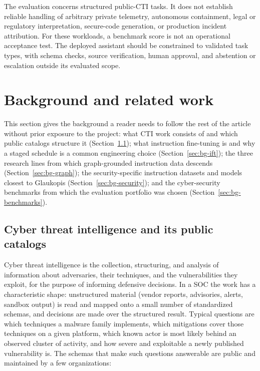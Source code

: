 \documentclass[twocolumn]{svjour3}
\begin{document}
The evaluation concerns structured public-CTI tasks. It does not establish reliable handling of arbitrary private telemetry, autonomous containment, legal or regulatory interpretation, secure-code generation, or production incident attribution. For these workloads, a benchmark score is not an operational acceptance test. The deployed assistant should be constrained to validated task types, with schema checks, source verification, human approval, and abstention or escalation outside its evaluated scope.

\section{Background and related work}\label{sec:related}
This section gives the background a reader needs to follow the rest of the article without prior exposure to the project: what CTI work consists of and which public catalogs structure it (Section~\ref{sec:bg-cti}); what instruction fine-tuning is and why a staged schedule is a common engineering choice (Section~\ref{sec:bg-ift}); the three research lines from which graph-grounded instruction data descends (Section~\ref{sec:bg-graph}); the security-specific instruction datasets and models closest to Glaukopis (Section~\ref{sec:bg-security}); and the cyber-security benchmarks from which the evaluation portfolio was chosen (Section~\ref{sec:bg-benchmarks}).

\subsection{Cyber threat intelligence and its public catalogs}\label{sec:bg-cti}
Cyber threat intelligence is the collection, structuring, and analysis of information about adversaries, their techniques, and the vulnerabilities they exploit, for the purpose of informing defensive decisions. In a SOC the work has a characteristic shape: unstructured material (vendor reports, advisories, alerts, sandbox output) is read and mapped onto a small number of standardized schemas, and decisions are made over the structured result. Typical questions are which techniques a malware family implements, which mitigations cover those techniques on a given platform, which known actor is most likely behind an observed cluster of activity, and how severe and exploitable a newly published vulnerability is. The schemas that make such questions answerable are public and maintained by a few organizations:
\end{document}
